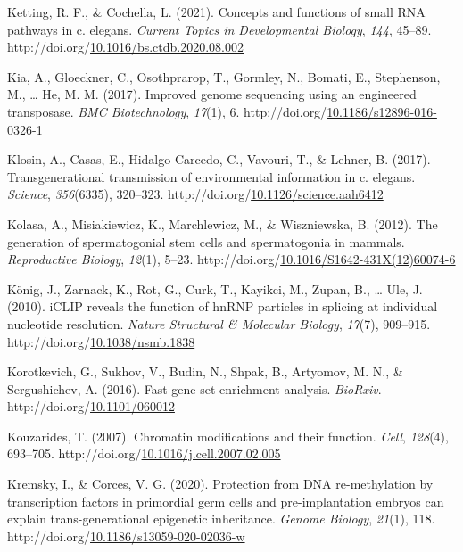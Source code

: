 \documentclass[12pt,twoside]{reedthesis}
\newlength{\cslhangindent}
\newenvironment{CSLReferences}[2] %
 {%
  \setlength{\parindent}{0pt}
  \ifodd #1 \everypar{\setlength{\hangindent}{\cslhangindent}}\ignorespaces\fi
  \ifnum #2 > 0
  \setlength{\parskip}{#2\baselineskip}
  \fi
 }%
 {}
\begin{document}
\begin{CSLReferences}{1}{0}
\leavevmode{}%
Ketting, R. F., \& Cochella, L. (2021). Concepts and functions of small RNA pathways in c. elegans. \emph{Current Topics in Developmental Biology}, \emph{144}, 45--89. http://doi.org/\href{https://doi.org/10.1016/bs.ctdb.2020.08.002}{10.1016/bs.ctdb.2020.08.002}

\leavevmode{}%
Kia, A., Gloeckner, C., Osothprarop, T., Gormley, N., Bomati, E., Stephenson, M., \ldots{} He, M. M. (2017). Improved genome sequencing using an engineered transposase. \emph{BMC Biotechnology}, \emph{17}(1), 6. http://doi.org/\href{https://doi.org/10.1186/s12896-016-0326-1}{10.1186/s12896-016-0326-1}

\leavevmode{}%
Klosin, A., Casas, E., Hidalgo-Carcedo, C., Vavouri, T., \& Lehner, B. (2017). Transgenerational transmission of environmental information in c. elegans. \emph{Science}, \emph{356}(6335), 320--323. http://doi.org/\href{https://doi.org/10.1126/science.aah6412}{10.1126/science.aah6412}

\leavevmode{}%
Kolasa, A., Misiakiewicz, K., Marchlewicz, M., \& Wiszniewska, B. (2012). The generation of spermatogonial stem cells and spermatogonia in mammals. \emph{Reproductive Biology}, \emph{12}(1), 5--23. http://doi.org/\href{https://doi.org/10.1016/S1642-431X(12)60074-6}{10.1016/S1642-431X(12)60074-6}

\leavevmode{}%
König, J., Zarnack, K., Rot, G., Curk, T., Kayikci, M., Zupan, B., \ldots{} Ule, J. (2010). iCLIP reveals the function of hnRNP particles in splicing at individual nucleotide resolution. \emph{Nature Structural \& Molecular Biology}, \emph{17}(7), 909--915. http://doi.org/\href{https://doi.org/10.1038/nsmb.1838}{10.1038/nsmb.1838}

\leavevmode{}%
Korotkevich, G., Sukhov, V., Budin, N., Shpak, B., Artyomov, M. N., \& Sergushichev, A. (2016). Fast gene set enrichment analysis. \emph{BioRxiv}. http://doi.org/\href{https://doi.org/10.1101/060012}{10.1101/060012}

\leavevmode{}%
Kouzarides, T. (2007). Chromatin modifications and their function. \emph{Cell}, \emph{128}(4), 693--705. http://doi.org/\href{https://doi.org/10.1016/j.cell.2007.02.005}{10.1016/j.cell.2007.02.005}

\leavevmode{}%
Kremsky, I., \& Corces, V. G. (2020). Protection from DNA re-methylation by transcription factors in primordial germ cells and pre-implantation embryos can explain trans-generational epigenetic inheritance. \emph{Genome Biology}, \emph{21}(1), 118. http://doi.org/\href{https://doi.org/10.1186/s13059-020-02036-w}{10.1186/s13059-020-02036-w}


\end{CSLReferences}
\end{document}
